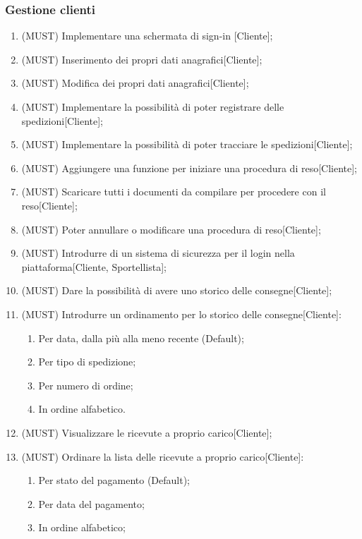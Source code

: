 \subsubsection{Gestione clienti}
\begin{enumerate}
  \item{(MUST)} Implementare una schermata di sign-in [Cliente];
  \item{(MUST)} Inserimento dei propri dati anagrafici[Cliente];
  \item{(MUST)} Modifica dei propri dati anagrafici[Cliente];
  \item{(MUST)} Implementare la possibilità di poter registrare delle spedizioni[Cliente]; 
  \item{(MUST)} Implementare la possibilità di poter tracciare le spedizioni[Cliente];
  \item{(MUST)} Aggiungere una funzione per iniziare una procedura di reso[Cliente];
  \item{(MUST)} Scaricare tutti i documenti da compilare per procedere con il reso[Cliente];
  \item{(MUST)} Poter annullare o modificare una procedura di reso[Cliente];
  \item{(MUST)} Introdurre di un sistema di sicurezza per il login nella piattaforma[Cliente, Sportellista];
  \item{(MUST)} Dare la possibilità di avere uno storico delle consegne[Cliente];
  \item{(MUST)} Introdurre un ordinamento per lo storico delle consegne[Cliente]:
    \begin{enumerate}
      \item Per data, dalla più alla meno recente (Default);
      \item Per tipo di spedizione;
      \item Per numero di ordine;
      \item In ordine alfabetico.
    \end{enumerate} 
  \item{(MUST)} Visualizzare le ricevute a proprio carico[Cliente];
  \item {(MUST)} Ordinare la lista delle ricevute a proprio carico[Cliente]:
    \begin{enumerate}
      \item Per stato del pagamento (Default);
      \item Per data del pagamento;
      \item In ordine alfabetico;
    \end{enumerate}

\end{enumerate}
